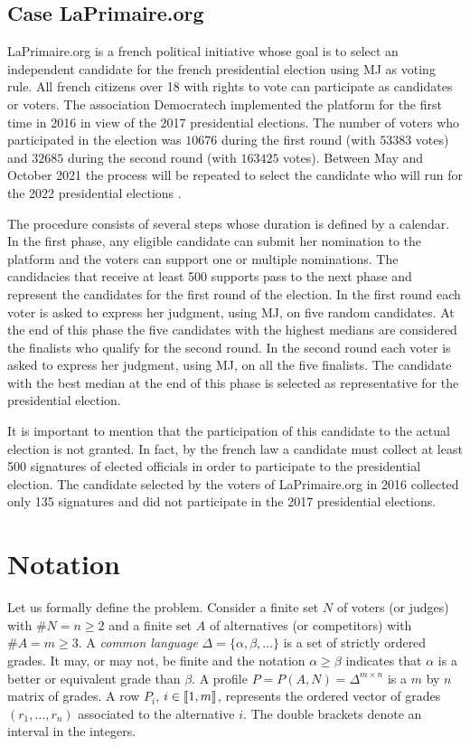 \documentclass[version=3.21, pagesize, twoside=off, bibliography=totoc, DIV=calc, fontsize=12pt, a4paper]{scrartcl}
\begin{document}
\subsection{Case LaPrimaire.org}
\label{sec:primaire}
LaPrimaire.org \citep{LaPrimaire} is a french political initiative whose goal is to select an independent candidate for the french presidential election using \acs{MJ} as voting rule. All french citizens over 18 with rights to vote can participate as candidates or voters. The association Democratech implemented the platform for the first time in 2016 in view of the 2017 presidential elections. The number of voters who participated in the election was $10676$ during the first round (with $53383$ votes) and $32685$ during the second round (with $163425$ votes). Between May and October 2021 the process will be repeated to select the candidate who will run for the 2022 presidential elections \citep{LaPrimaire2022}.

The procedure consists of several steps whose duration is defined by a calendar. In the first phase, any eligible candidate can submit her nomination to the platform and the voters can support one or multiple nominations. The candidacies that receive at least 500 supports pass to the next phase and represent the candidates for the first round of the election. In the first round each voter is asked to express her judgment, using \acs{MJ}, on five random candidates. At the end of this phase the five candidates with the highest medians are considered the finalists who qualify for the second round. In the second round each voter is asked to express her judgment, using \acs{MJ}, on all the five finalists. The candidate with the best median at the end of this phase is selected as representative for the presidential election.

It is important to mention that the participation of this candidate to the actual election is not granted. In fact, by the french law a candidate must collect at least 500 signatures of elected officials in order to participate to the presidential election. The candidate selected by the voters of LaPrimaire.org in 2016 collected only 135 signatures and did not participate in the 2017 presidential elections.  

\section{Notation}
Let us formally define the problem. Consider a finite set $N$ of voters (or judges) with $\#N=n\geq 2$ and a finite set $A$ of alternatives (or competitors) with $\#A=m\geq 3$. 
A \textit{common language} $\Delta = \{ \alpha, \beta, \dots \}$ is a set of strictly ordered grades. It may, or may not, be finite and the notation $\alpha \geq \beta$ indicates that $\alpha$ is a better or equivalent grade than $\beta$. A profile $P = P(A,N) = \Delta^{m \times n}$ is a $m$ by $n$ matrix of grades. A row $P_i$, $i\in \llbracket1,m\rrbracket$, represents the ordered vector of grades $(r_1 , \dots, r_n )$ associated to the alternative $i$. The double brackets denote an interval in the integers. 
\end{document}
